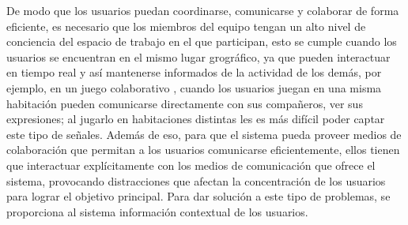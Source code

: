 De modo que los usuarios puedan coordinarse, comunicarse y colaborar de forma eficiente, es necesario que los miembros del equipo tengan un alto nivel de conciencia del espacio de trabajo en el que participan, esto se cumple cuando los usuarios se encuentran en el mismo lugar grogr\'afico, ya que pueden interactuar en tiempo real y as\'i mantenerse informados de la actividad de los dem\'as, por ejemplo, en un juego colaborativo \citep{montane2013context}, cuando los usuarios juegan en una misma habitaci\'on pueden comunicarse directamente con sus compa\~neros, ver sus expresiones; al jugarlo en habitaciones distintas les es m\'as dif\'icil poder captar este tipo de se\~nales. Adem\'as de eso, para que el sistema pueda proveer medios de colaboraci\'on que permitan a los usuarios comunicarse eficientemente, ellos tienen que interactuar expl\'icitamente con los medios de comunicaci\'on que ofrece el sistema, provocando distracciones que afectan la concentraci\'on de los usuarios para lograr el objetivo principal. Para dar soluci\'on a este tipo de problemas, se proporciona al sistema informaci\'on contextual de los usuarios.